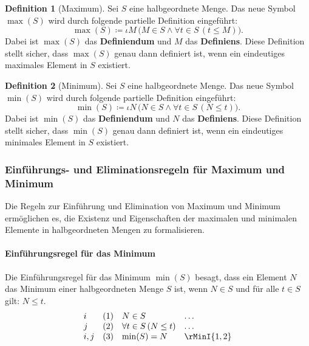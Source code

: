 \documentclass{book}
\theoremstyle{plain}
\theoremstyle{remark}
\theoremstyle{definition}
\newtheorem{definition}{Definition}[section]
\begin{document}
\begin{definition}[Maximum]
    Sei \( S \) eine halbgeordnete Menge. Das neue Symbol \(\max(S)\) wird durch folgende partielle Definition eingeführt:
    \[
    \max(S) \coloneqq \iota M \, \big(M \in S \land \forall t \in S \, (t \leq M)\big).
    \]
    Dabei ist \(\max(S)\) das \textbf{Definiendum} und \( M \) das \textbf{Definiens}. Diese Definition stellt sicher, dass \(\max(S)\) genau dann definiert ist, wenn ein eindeutiges maximales Element in \( S \) existiert.
\end{definition}

\begin{definition}[Minimum]
    Sei \( S \) eine halbgeordnete Menge. Das neue Symbol \(\min(S)\) wird durch folgende partielle Definition eingeführt:
    \[
    \min(S) \coloneqq \iota N \, \big(N \in S \land \forall t \in S \, (N \leq t)\big).
    \]
    Dabei ist \(\min(S)\) das \textbf{Definiendum} und \( N \) das \textbf{Definiens}. Diese Definition stellt sicher, dass \(\min(S)\) genau dann definiert ist, wenn ein eindeutiges minimales Element in \( S \) existiert.
\end{definition}

\subsubsection{Einführungs- und Eliminationsregeln für Maximum und Minimum}
\label{rule:rMaxI} \label{rule:rMaxE} \label{rule:rMinI} \label{rule:rMinE}

Die Regeln zur Einführung und Elimination von Maximum und Minimum ermöglichen es, die Existenz und Eigenschaften der maximalen und minimalen Elemente in halbgeordneten Mengen zu formalisieren.

\paragraph{Einführungsregel für das Minimum}
Die Einführungsregel für das Minimum \(\min(S)\) besagt, dass ein Element \(N\) das Minimum einer halbgeordneten Menge \(S\) ist, wenn \(N \in S\) und für alle \(t \in S\) gilt: \(N \leq t\).
\[
\begin{array}{llll}
    i   & (1) & N \in S & \dots \\
    j   & (2) & \forall t \in S \, (N \leq t) & \dots \\
    i,j & (3) & \min(S) = N & \rMinI{1,2}
\end{array}
\]
\end{document}
